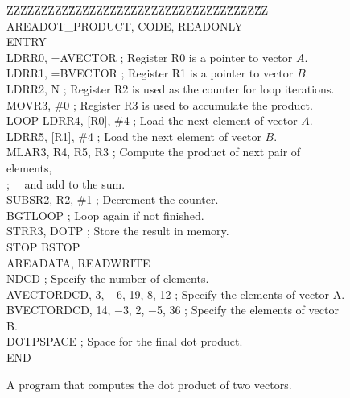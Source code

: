 \documentclass[11pt, twoside, pdftex]{article}
\begin{document}
\begin{figure}[H]
\begin{center} %
\parbox{12.5cm}{
\begin{tabbing}
ZZZZZZZZZ\=ZZZZZZZ\=ZZZZZZZZZZZZZZZZ\=ZZ\=ZZ\=ZZ\kill
\>AREA\>DOT\_PRODUCT, CODE, READONLY \\
\>ENTRY \\
\>LDR\>R0, =AVECTOR \>; Register R0 is a pointer to vector $A$. \\
\>LDR\>R1, =BVECTOR \>; Register R1 is a pointer to vector $B$. \\
\>LDR\>R2, N \>; Register R2 is used as the counter for loop iterations. \\
\>MOV\>R3, \#0 \>; Register R3 is used to accumulate the product. \\
LOOP \>LDR\>R4, [R0], \#4 \>; Load the next element of vector $A$.  \\
\>LDR\>R5, [R1], \#4 \>; Load the next element of vector $B$. \\
\>MLA\>R3, R4, R5, R3 \>; Compute the product of next pair of elements, \\
\>\>\>; ~~and add to the sum. \\
\>SUBS\>R2, R2, \#1 \>; Decrement the counter. \\
\>BGT\>LOOP \>; Loop again if not finished. \\
\>STR\>R3, DOTP \>; Store the result in memory. \\
STOP \>B\>STOP \\

\>AREA\>DATA, READWRITE \\ 
N\>DCD \>; Specify the number of elements. \\
AVECTOR\>DCD, 3, $-$6, 19, 8, 12 \>; Specify the elements of vector A. \\
BVECTOR\>DCD, 14, $-$3, 2, $-$5, 36 \>; Specify the elements of vector B. \\
DOTP\>SPACE \>; Space for the final dot product. \\
\>END \\

\end{tabbing} } %
\end{center}
	\vspace{-0.33in}
	\caption{A program that computes the dot product of two vectors.}
	\label{fig:3}
\end{figure}
 
\end{document}
